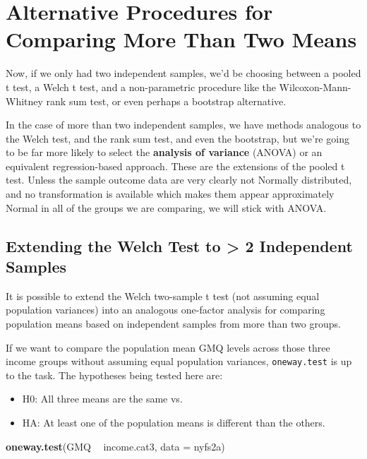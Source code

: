 \documentclass[
]{book}
\newenvironment{Shaded}{\begin{snugshade}}{\end{snugshade}}
\newcommand{\DataTypeTok}[1]{\textcolor[rgb]{0.13,0.29,0.53}{#1}}
\newcommand{\KeywordTok}[1]{\textcolor[rgb]{0.13,0.29,0.53}{\textbf{#1}}}
\newcommand{\NormalTok}[1]{#1}
\newcommand{\OperatorTok}[1]{\textcolor[rgb]{0.81,0.36,0.00}{\textbf{#1}}}
\newcommand{\StringTok}[1]{\textcolor[rgb]{0.31,0.60,0.02}{#1}}
\providecommand{\tightlist}{%
  \setlength{\itemsep}{0pt}\setlength{\parskip}{0pt}}
\begin{document}
\hypertarget{alternative-procedures-for-comparing-more-than-two-means}{%
\section{Alternative Procedures for Comparing More Than Two Means}\label{alternative-procedures-for-comparing-more-than-two-means}}

Now, if we only had two independent samples, we'd be choosing between a pooled t test, a Welch t test, and a non-parametric procedure like the Wilcoxon-Mann-Whitney rank sum test, or even perhaps a bootstrap alternative.

In the case of more than two independent samples, we have methods analogous to the Welch test, and the rank sum test, and even the bootstrap, but we're going to be far more likely to select the \textbf{analysis of variance} (ANOVA) or an equivalent regression-based approach. These are the extensions of the pooled t test. Unless the sample outcome data are very clearly not Normally distributed, and no transformation is available which makes them appear approximately Normal in all of the groups we are comparing, we will stick with ANOVA.

\hypertarget{extending-the-welch-test-to-2-independent-samples}{%
\subsection{Extending the Welch Test to \textgreater{} 2 Independent Samples}\label{extending-the-welch-test-to-2-independent-samples}}

It is possible to extend the Welch two-sample t test (not assuming equal population variances) into an analogous one-factor analysis for comparing population means based on independent samples from more than two groups.

If we want to compare the population mean GMQ levels across those three income groups without assuming equal population variances, \texttt{oneway.test} is up to the task. The hypotheses being tested here are:

\begin{itemize}
\tightlist
\item
  H0: All three means are the same vs.
\item
  HA: At least one of the population means is different than the others.
\end{itemize}

\begin{Shaded}
\begin{Highlighting}[]
\KeywordTok{oneway.test}\NormalTok{(GMQ }\OperatorTok{~}\StringTok{ }\NormalTok{income.cat3, }\DataTypeTok{data =}\NormalTok{ nyfs2a)}
\end{Highlighting}
\end{Shaded}
\end{document}
